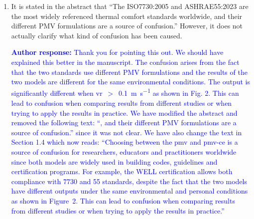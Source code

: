 \documentclass[a4paper, 10pt]{letter}
\newcommand{\response}[1]{\textcolor{blue}{\textbf{Author response:} #1}}
\begin{document}
\begin{letter}
\begin{enumerate}
            \response{This manuscript aims to determine and compare the accuracy of the \ac{pmv} models included in the ISO 7730:2005 and ASHRAE 55:2023 standards.
            We did this by comparing the results of the \ac{pmv} model with the thermal sensation votes collected in the \ac{db2}.
            In addition to comparing the accuracy of the two \ac{pmv} models, we also discussed in the paper that the \ac{pmv} model is inappropriately used by some authors to predict thermal sensation of individuals outside its range of applicability.
            As a consequence, we recommend limiting the applicability of the \ac{pmv} model to the range specified in the Table 2 of the manuscript.
            }

            \item It is stated in the abstract that ``The ISO7730:2005 and ASHRAE55:2023 are the most widely referenced thermal comfort standards worldwide, and their different PMV formulations are a source of confusion.''
            However, it does not actually clarify what kind of confusion has been caused.

            \response{Thank you for pointing this out.
            We should have explained this better in the manuscript.
            The confusion arises from the fact that the two standards use different PMV formulations and the results of the two models are different for the same environmental conditions.
            The output is significantly different when \ac{vr}~$>$~\qty{0.1}{\m\per\s} as shown in Fig. 2.
            This can lead to confusion when comparing results from different studies or when trying to apply the results in practice.
            We have modified the abstract and removed the following text: ``, and their different PMV formulations are a source of confusion.'' since it was not clear.
            We have also change the text in Section 1.4 which now reads: ``Choosing between the \ac{pmv} and \ac{pmv-ce} is a source of confusion for researchers, educators and practitioners worldwide since both models are widely used in building codes, guidelines and certification programs.
            For example, the WELL certification allows both compliance with \gls{7730} and \gls{55} standards, despite the fact that the two models have different outputs under the same environmental and personal conditions as shown in Figure~2. This can lead to confusion when comparing results from different studies or when trying to apply the results in practice.''
            }


\end{enumerate}
\end{letter}
\end{document}
